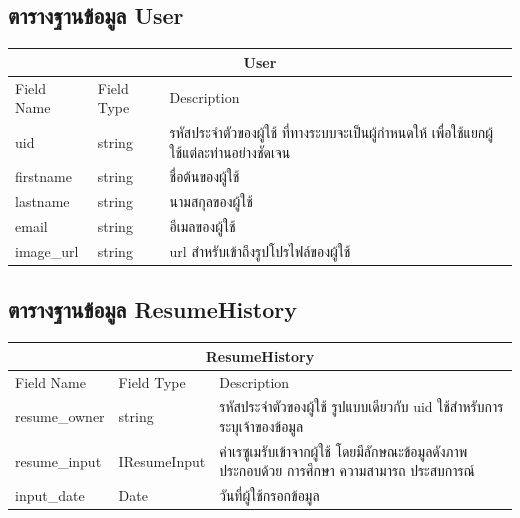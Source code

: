 \subsection{ตารางฐานข้อมูล User}
\begin{table}[H]
    \begin{tabularx}{\textwidth}{|l|l|X|}
        \hline
        \multicolumn{3}{|c|}{User}                                                                                                      \\ \hline
        Field Name  & Field Type & Description                                                                                        \\ \hline
        uid         & string     & รหัสประจำตัวของผู้ใช้ ที่ทางระบบจะเป็นผู้กำหนดให้ เพื่อใช้แยกผู้ใช้แต่ละท่านอย่างชัดเจน            \\
        firstname   & string     & ชื่อต้นของผู้ใช้                                                                                   \\
        lastname    & string     & นามสกุลของผู้ใช้                                                                                   \\
        email       & string     & อีเมลของผู้ใช้                                                                                     \\
        image\_url  & string     & url สำหรับเข้าถึงรูปโปรไฟล์ของผู้ใช้ \\ \hline
    \end{tabularx}
\end{table}

\subsection{ตารางฐานข้อมูล ResumeHistory}
\begin{table}[H]
    \begin{tabularx}{\textwidth}{|l|l|X|}
        \hline
        \multicolumn{3}{|c|}{ResumeHistory}                                                                   \\\hline
        Field Name    & Field Type & Description                                                            \\\hline
        resume\_owner & string     & รหัสประจำตัวของผู้ใช้ รูปแบบเดียวกับ uid ใช้สำหรับการระบุเจ้าของข้อมูล \\
        resume\_input   & IResumeInput     & ค่าเรซูเมรับเข้าจากผู้ใช้ โดยมีลักษณะข้อมูลดังภาพ ประกอบด้วย การศึกษา ความสามารถ ประสบการณ์ \\
        input\_date   & Date       & วันที่ผู้ใช้กรอกข้อมูล \\ \hline
    \end{tabularx}
\end{table}

